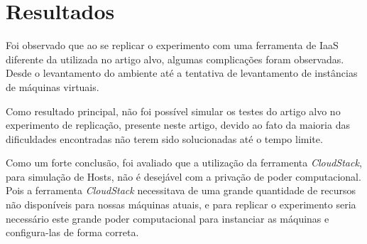 \section{Resultados}

Foi observado que ao se replicar o experimento com uma ferramenta de IaaS diferente da utilizada no artigo alvo, algumas complicações foram observadas. Desde o levantamento do ambiente até a tentativa de levantamento de instâncias de máquinas virtuais.

Como resultado principal, não foi possível simular os testes do artigo alvo no experimento de replicação, presente neste artigo, devido ao fato da maioria das dificuldades encontradas não terem sido solucionadas até o tempo limite.

Como um forte conclusão, foi avaliado que a utilização da ferramenta \textit{CloudStack}, para simulação de Hosts, não é desejável com a privação de poder computacional. Pois a ferramenta \textit{CloudStack} necessitava de uma grande quantidade de recursos não disponíveis para nossas máquinas atuais, e para replicar o experimento seria necessário este grande poder computacional para instanciar as máquinas e configura-las de forma correta.
